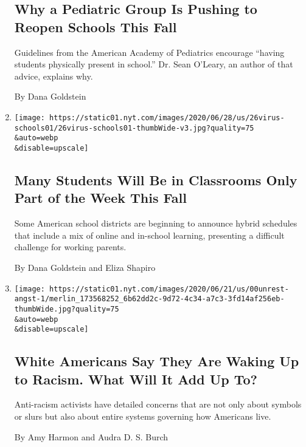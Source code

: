 \begin{enumerate}
{  \subsection{Why a Pediatric Group Is Pushing to Reopen Schools This
  Fall}\label{why-a-pediatric-group-is-pushing-to-reopen-schools-this-fall}}

  Guidelines from the American Academy of Pediatrics encourage ``having
  students physically present in school.'' Dr. Sean O'Leary, an author
  of that advice, explains why.

  By Dana Goldstein
\item
  \href{/2020/06/26/us/coronavirus-schools-reopen-fall.html}{}

  \texttt{[image: https://static01.nyt.com/images/2020/06/28/us/26virus-schools01/26virus-schools01-thumbWide-v3.jpg?quality=75\\\&auto=webp\\\&disable=upscale]}

  \hypertarget{many-students-will-be-in-classrooms-only-part-of-the-week-this-fall}{%
  \subsection{Many Students Will Be in Classrooms Only Part of the Week
  This
  Fall}\label{many-students-will-be-in-classrooms-only-part-of-the-week-this-fall}}

  Some American school districts are beginning to announce hybrid
  schedules that include a mix of online and in-school learning,
  presenting a difficult challenge for working parents.

  By Dana Goldstein and Eliza Shapiro
\item
  \href{/2020/06/22/us/racism-white-americans.html}{}

  \texttt{[image: https://static01.nyt.com/images/2020/06/21/us/00unrest-angst-1/merlin\_173568252\_6b62dd2c-9d72-4c34-a7c3-3fd14af256eb-thumbWide.jpg?quality=75\\\&auto=webp\\\&disable=upscale]}

  \hypertarget{white-americans-say-they-are-waking-up-to-racism-what-will-it-add-up-to}{%
  \subsection{White Americans Say They Are Waking Up to Racism. What
  Will It Add Up
  To?}\label{white-americans-say-they-are-waking-up-to-racism-what-will-it-add-up-to}}

  Anti-racism activists have detailed concerns that are not only about
  symbols or slurs but also about entire systems governing how Americans
  live.

  By Amy Harmon and Audra D. S. Burch
\end{enumerate}

